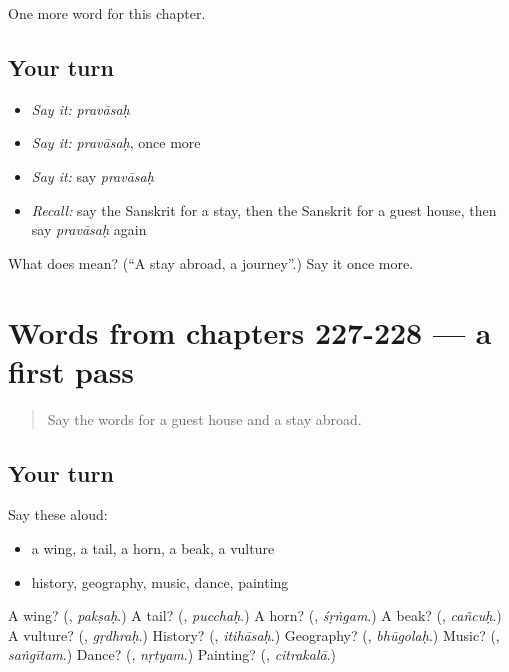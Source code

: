 \begin{grammarlens}[title={What you've built}]
One more word for this chapter.
\end{grammarlens}

\subsection*{Your turn}
\begin{itemize}
\raggedright
  \item \emph{Say it:} \emph{pravāsaḥ}
  \item \emph{Say it:} \emph{pravāsaḥ}, once more
  \item \emph{Say it:} say \emph{pravāsaḥ}
  \item \emph{Recall:} say the Sanskrit for a stay, then the Sanskrit for a guest house, then say \emph{pravāsaḥ} again
\end{itemize}

\begin{tcolorbox}[breakable,colback=teal!4,colframe=teal!35!black,title={Before you move on}]
What does  mean? (\textquotedblleft{}A stay abroad, a journey\textquotedblright{}.) Say it once more.
\end{tcolorbox}
\section[(dialogue)]{Words from chapters 227-228 — a first pass}

\label{lesson:SA-R231-first-pass-words-from-chapters-227-228}



\begin{quote}
Say the words for a guest house and a stay abroad.
\end{quote}

\subsection*{Your turn}
Say these aloud:

\begin{itemize}
\raggedright
  \item a wing, a tail, a horn, a beak, a vulture
  \item history, geography, music, dance, painting
\end{itemize}

\begin{tcolorbox}[breakable,colback=teal!4,colframe=teal!35!black,title={Before you move on}]
A wing? (\textbf{}, \emph{pakṣaḥ}.) A tail? (\textbf{}, \emph{pucchaḥ}.) A horn? (\textbf{}, \emph{śṛṅgam}.) A beak? (\textbf{}, \emph{cañcuḥ}.) A vulture? (\textbf{}, \emph{gṛdhraḥ}.) History? (\textbf{}, \emph{itihāsaḥ}.) Geography? (\textbf{}, \emph{bhūgolaḥ}.) Music? (\textbf{}, \emph{saṅgītam}.) Dance? (\textbf{}, \emph{nṛtyam}.) Painting? (\textbf{}, \emph{citrakalā}.)
\end{tcolorbox}
